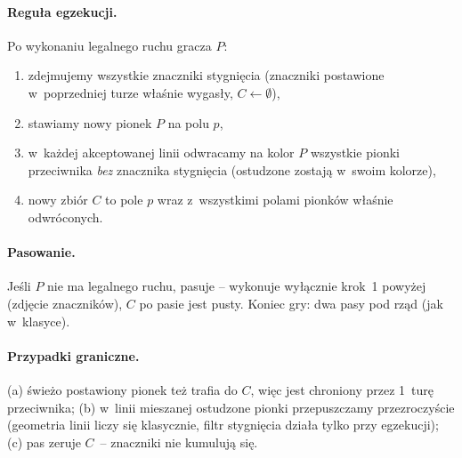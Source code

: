 \documentclass[11pt,a4paper]{article}
\begin{document}
\paragraph{Reguła egzekucji.} Po wykonaniu legalnego ruchu gracza $P$:
\begin{enumerate}[leftmargin=1.5em,itemsep=2pt]
    \item zdejmujemy wszystkie znaczniki stygnięcia (znaczniki postawione w~poprzedniej turze właśnie wygasły, $C \leftarrow \emptyset$),
    \item stawiamy nowy pionek $P$ na polu $p$,
    \item w~każdej akceptowanej linii odwracamy na kolor $P$ wszystkie pionki przeciwnika \emph{bez} znacznika stygnięcia (ostudzone zostają w~swoim kolorze),
    \item nowy zbiór $C$ to pole $p$ wraz z~wszystkimi polami pionków właśnie odwróconych.
\end{enumerate}

\paragraph{Pasowanie.} Jeśli $P$ nie ma legalnego ruchu, pasuje -- wykonuje wyłącznie krok~1 powyżej (zdjęcie znaczników), $C$ po pasie jest pusty. Koniec gry: dwa pasy pod rząd (jak w~klasyce).

\paragraph{Przypadki graniczne.} (a) świeżo postawiony pionek też trafia do $C$, więc jest chroniony przez 1~turę przeciwnika; (b) w~linii mieszanej ostudzone pionki przepuszczamy przezroczyście (geometria linii liczy się klasycznie, filtr stygnięcia działa tylko przy egzekucji); (c) pas zeruje $C$~-- znaczniki nie kumulują się.
\end{document}
